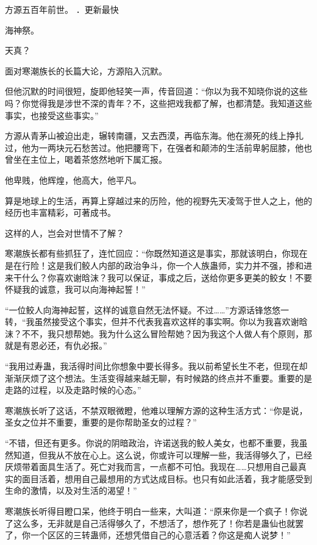 
\begin{this_body}



方源五百年前世。 ．更新最快

海神祭。

天真？

面对寒潮族长的长篇大论，方源陷入沉默。

但他沉默的时间很短，旋即他轻笑一声，传音回道：“你以为我不知晓你说的这些吗？你觉得我是涉世不深的青年？不，这些把戏我都了解，也都清楚。我知道这些事实，也接受这些事实。”

方源从青茅山被迫出走，辗转南疆，又去西漠，再临东海。他在濒死的线上挣扎过，他为一两块元石愁苦过。他把腰弯下，在强者和颠沛的生活前卑躬屈膝，他也曾坐在主位上，喝着茶悠然地听下属汇报。

他卑贱，他辉煌，他高大，他平凡。

算是地球上的生活，再算上穿越过来的历险，他的视野先天凌驾于世人之上，他的经历也丰富精彩，可著成书。

这样的人，岂会对世情不了解？

寒潮族长都有些抓狂了，连忙回应：“你既然知道这是事实，那就该明白，你现在是在行险！这是我们鲛人内部的政治争斗，你一个人族蛊师，实力并不强，掺和进来干什么？你喜欢谢晗沫？我可以保证，事成之后，送给你更多更美的鲛女！不要怀疑我的诚意，我可以向海神起誓！”

“一位鲛人向海神起誓，这样的诚意自然无法怀疑。不过……”方源话锋悠悠一转，“我虽然接受这个事实，但并不代表我喜欢这样的事实啊。你以为我喜欢谢晗沫？不不，我只想帮她。我为什么这么冒险帮她？因为我这个人做人有个原则，那就是有恩必还，有仇必报。”

“我用过寿蛊，我活得时间比你想象中要长得多。我以前希望长生不老，但现在却渐渐厌烦了这个想法。生活变得越来越无聊，有时候路的终点并不重要。重要的是走路的过程，以及走路时候的心态。”

寒潮族长听了这话，不禁双眼微瞪，他难以理解方源的这种生活方式：“你是说，圣女之位并不重要，重要的是你帮助圣女的过程？”

“不错，但还有更多。你说的阴暗政治，许诺送我的鲛人美女，也都不重要，我虽然知道，但我从不放在心上。这么说，你或许可以理解一些，我活得够久了，已经厌烦带着面具生活了。死亡对我而言，一点都不可怕。我现在……只想用自己最真实的面目活着，想用自己最想用的方式达成目标。也只有如此活着，我才能感受到生命的激情，以及对生活的渴望！”

寒潮族长听得目瞪口呆，他终于明白一些来，大叫道：“原来你是一个疯子！你说了这么多，无非就是自己活得够久了，不想活了，想作死了！你若是蛊仙也就罢了，你一个区区的三转蛊师，还想凭借自己的心意活着？你这是痴人说梦！”


\end{this_body}
